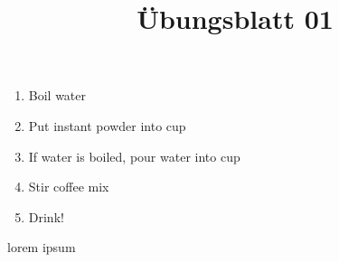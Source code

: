 \documentclass{levy}
\title{Übungsblatt 01}
\begin{document}
	
\maketitle




\subtask




\begin{enumerate}[label=(\alph*)]	
	
	\item 
	Boil water 
	
		
	\item 
	Put instant powder into cup 
	
	\item 
	If water is boiled, pour water into cup
	
	\item 
	Stir coffee mix
	
	\item 
	Drink!		
	
\end{enumerate}

\subtask

lorem ipsum


\subtask
\end{document}
